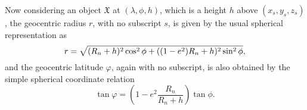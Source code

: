 \documentclass[11pt,dvipsnames]{thesis}
\begin{document}
Now considering an object $\mathfrak{X}$ at $(\lambda, \phi, h)$, which is a height $h$ above $(x_s, y_s, z_s)$, the geocentric radius $r$, with no subscript $s$, is given by the usual spherical representation as 
\begin{equation}
r = \sqrt{(R_n + h)^2 \cos^2\phi + ((1 - e^2)R_n + h)^2\,\smash{\sin}^2\,\phi}, 
\end{equation}
and the geocentric latitude $\varphi$, again with no subscript, is also obtained by the simple spherical coordinate relation
\begin{equation}
\tan\varphi = \left(1 - e^2 \frac{R_n}{R_n + h}\right) \tan\phi.
\end{equation}

\end{document}
